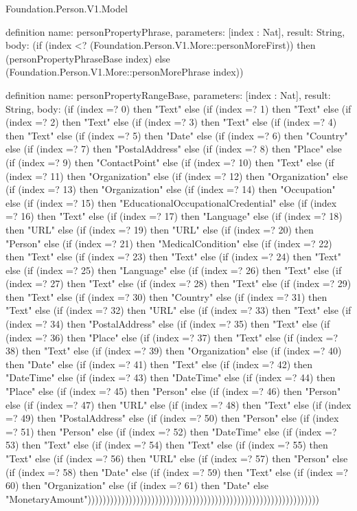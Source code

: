 \begin{lexlean}{Foundation.Person.V1.Model}
\begin{semanticmodule}
definition{
  name: personPropertyPhrase,
  parameters: [index : Nat],
  result: String,
  body: (if (index <? (Foundation.Person.V1.More::personMoreFirst)) then (personPropertyPhraseBase index) else (Foundation.Person.V1.More::personMorePhrase index))
}

definition{
  name: personPropertyRangeBase,
  parameters: [index : Nat],
  result: String,
  body: (if (index =? 0) then "Text" else (if (index =? 1) then "Text" else (if (index =? 2) then "Text" else (if (index =? 3) then "Text" else (if (index =? 4) then "Text" else (if (index =? 5) then "Date" else (if (index =? 6) then "Country" else (if (index =? 7) then "PostalAddress" else (if (index =? 8) then "Place" else (if (index =? 9) then "ContactPoint" else (if (index =? 10) then "Text" else (if (index =? 11) then "Organization" else (if (index =? 12) then "Organization" else (if (index =? 13) then "Organization" else (if (index =? 14) then "Occupation" else (if (index =? 15) then "EducationalOccupationalCredential" else (if (index =? 16) then "Text" else (if (index =? 17) then "Language" else (if (index =? 18) then "URL" else (if (index =? 19) then "URL" else (if (index =? 20) then "Person" else (if (index =? 21) then "MedicalCondition" else (if (index =? 22) then "Text" else (if (index =? 23) then "Text" else (if (index =? 24) then "Text" else (if (index =? 25) then "Language" else (if (index =? 26) then "Text" else (if (index =? 27) then "Text" else (if (index =? 28) then "Text" else (if (index =? 29) then "Text" else (if (index =? 30) then "Country" else (if (index =? 31) then "Text" else (if (index =? 32) then "URL" else (if (index =? 33) then "Text" else (if (index =? 34) then "PostalAddress" else (if (index =? 35) then "Text" else (if (index =? 36) then "Place" else (if (index =? 37) then "Text" else (if (index =? 38) then "Text" else (if (index =? 39) then "Organization" else (if (index =? 40) then "Date" else (if (index =? 41) then "Text" else (if (index =? 42) then "DateTime" else (if (index =? 43) then "DateTime" else (if (index =? 44) then "Place" else (if (index =? 45) then "Person" else (if (index =? 46) then "Person" else (if (index =? 47) then "URL" else (if (index =? 48) then "Text" else (if (index =? 49) then "PostalAddress" else (if (index =? 50) then "Person" else (if (index =? 51) then "Person" else (if (index =? 52) then "DateTime" else (if (index =? 53) then "Text" else (if (index =? 54) then "Text" else (if (index =? 55) then "Text" else (if (index =? 56) then "URL" else (if (index =? 57) then "Person" else (if (index =? 58) then "Date" else (if (index =? 59) then "Text" else (if (index =? 60) then "Organization" else (if (index =? 61) then "Date" else "MonetaryAmount"))))))))))))))))))))))))))))))))))))))))))))))))))))))))))))))
}


\end{semanticmodule}
\end{lexlean}
